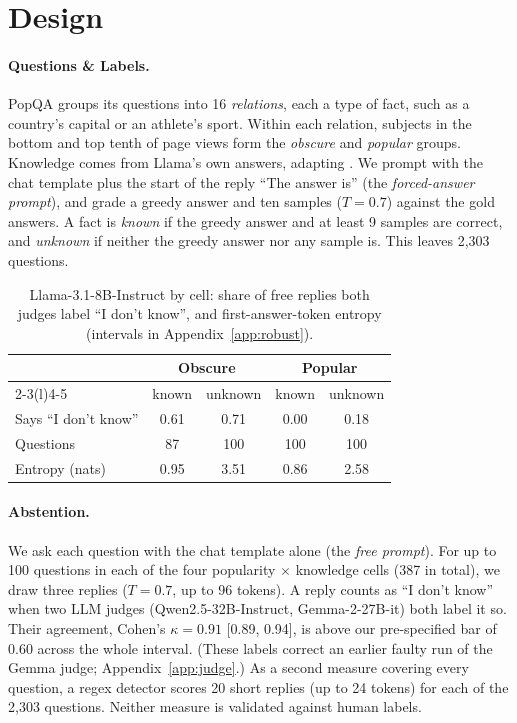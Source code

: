 \documentclass[letterpaper]{article} %
\newcommand{\idk}{``I don't know''}
\begin{document}
\section{Design}

\paragraph{Questions \& Labels.}
PopQA \citep{mallen2023popqa} groups its questions into 16 \emph{relations}, each a type of fact, such as a country's capital or an athlete's sport. Within each relation, subjects in the bottom and top tenth of page views form the \emph{obscure} and \emph{popular} groups. Knowledge comes from Llama's own answers, adapting \citet{gekhman2024finetuning}. We prompt with the chat template plus the start of the reply ``The answer is'' (the \emph{forced-answer prompt}), and grade a greedy answer and ten samples ($T = 0.7$) against the gold answers. A fact is \emph{known} if the greedy answer and at least 9 samples are correct, and \emph{unknown} if neither the greedy answer nor any sample is. This leaves 2,303 questions.

\begin{table}[t]
\centering
\small
\setlength{\tabcolsep}{1.3mm}
\begin{tabular}{@{}lcccc@{}}
\toprule
 & \multicolumn{2}{c}{Obscure} & \multicolumn{2}{c}{Popular} \\
\cmidrule(lr){2-3}\cmidrule(l){4-5}
 & known & unknown & known & unknown \\
\midrule
Says \idk & 0.61 & 0.71 & 0.00 & 0.18 \\
Questions & 87 & 100 & 100 & 100 \\
Entropy (nats) & 0.95 & 3.51 & 0.86 & 2.58 \\
\bottomrule
\end{tabular}
\caption{Llama-3.1-8B-Instruct by cell: share of free replies both judges label \idk, and first-answer-token entropy (intervals in Appendix~\ref{app:robust}).}
\label{tab:cells}
\end{table}

\paragraph{Abstention.}
We ask each question with the chat template alone (the \emph{free prompt}). For up to 100 questions in each of the four popularity $\times$ knowledge cells (387 in total), we draw three replies ($T = 0.7$, up to 96 tokens). A reply counts as \idk{} when two LLM judges (Qwen2.5-32B-Instruct, Gemma-2-27B-it) both label it so. Their agreement, Cohen's $\kappa = 0.91$ [0.89, 0.94], is above our pre-specified bar of 0.60 across the whole interval. (These labels correct an earlier faulty run of the Gemma judge; Appendix~\ref{app:judge}.) As a second measure covering every question, a regex detector scores 20 short replies (up to 24 tokens) for each of the 2,303 questions. Neither measure is validated against human labels.
\end{document}
